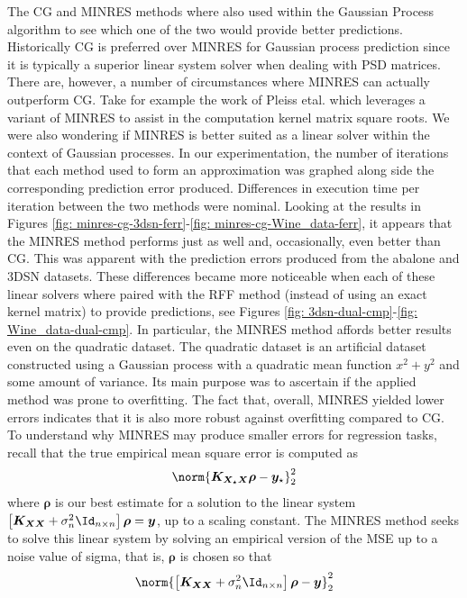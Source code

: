 The CG and MINRES methods where also used within the Gaussian Process algorithm to see which one of the two would provide better predictions. Historically CG is preferred over MINRES for Gaussian process prediction since it is typically a superior linear system solver when dealing with PSD matrices. There are, however, a number of circumstances where MINRES can actually outperform CG. Take for example the work of Pleiss etal. \cite{arxiv200611267} which leverages a variant of MINRES to assist in the computation kernel matrix square roots. We were also wondering if MINRES is better suited as a linear solver within the context of Gaussian processes. In our experimentation, the number of iterations that each method used to form an approximation was graphed along side the corresponding prediction error produced. Differences in execution time per iteration between the two methods were nominal. Looking at the results in Figures \ref{fig: minres-cg-3dsn-ferr}-\ref{fig: minres-cg-Wine_data-ferr}, it appears that the MINRES method performs just as well and, occasionally, even better than CG. This was apparent with the prediction errors produced from the abalone and 3DSN datasets. These differences became more noticeable when each of these linear solvers where paired with the RFF method (instead of using an exact kernel matrix) to provide predictions, see Figures \ref{fig: 3dsn-dual-cmp}-\ref{fig: Wine_data-dual-cmp}. In particular, the MINRES method affords better results even on the quadratic dataset. The quadratic dataset is an artificial dataset constructed using a Gaussian process with a quadratic mean function $x^2 + y^2$ and some amount of variance. Its main purpose was to ascertain if the applied method was prone to overfitting. The fact that, overall, MINRES yielded lower errors indicates that it is also more robust against overfitting compared to CG. To understand why MINRES may produce smaller errors for regression tasks, recall that the true empirical mean square error is computed as
\begin{align*}
    \norm{\bm{K_{X_{\star} X}} \bm{\rho} - \bm{y}_{\star}}_2^2
\end{align*}
where $\bm{\rho}$ is our best estimate for a solution to the linear system $\left[ \bm{K_{XX}} + \sigma_n^2 \Id_{n \times n} \right] \bm{\rho} = \bm{y}$, up to a scaling constant. The MINRES method seeks to solve this linear system by solving an empirical version of the MSE up to a noise value of sigma, that is, $\bm{\rho}$ is chosen so that
\begin{equation*}
    \norm{\left[ \bm{K_{XX}} + \sigma_n^2 \Id_{n \times n} \right] \bm{\rho} - \bm{y}}_2^2
\end{equation*}
